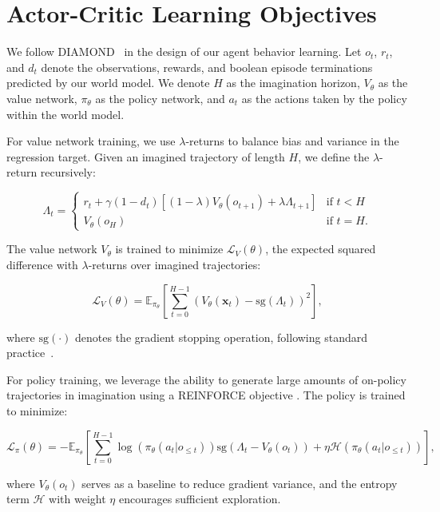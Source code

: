 \section{Actor-Critic Learning Objectives}
\label{appendix:rl_objectives}

We follow DIAMOND~\cite{alonso2024diamond} in the design of our agent behavior learning. Let $o_t$, $r_t$, and $d_t$ denote the observations, rewards, and boolean episode terminations predicted by our world model. We denote $H$ as the imagination horizon, $V_\theta$ as the value network, $\pi_\theta$ as the policy network, and $a_t$ as the actions taken by the policy within the world model.

For value network training, we use $\lambda$-returns to balance bias and variance in the regression target. Given an imagined trajectory of length $H$, we define the $\lambda$-return recursively:

\begin{equation}
   \Lambda_t = \begin{cases}
       r_t + \gamma(1-d_t)[(1-\lambda)V_\theta(o_{t+1}) + \lambda\Lambda_{t+1}] & \text{if } t < H \\
       V_\theta(o_H) & \text{if } t = H.
   \end{cases}
\end{equation}

The value network $V_\theta$ is trained to minimize $\mathcal{L}_V(\theta)$, the expected squared difference with $\lambda$-returns over imagined trajectories:

\begin{equation}
   \mathcal{L}_V(\theta) = \mathbb{E}_{\pi_\theta}\left[\sum_{t=0}^{H-1} (V_\theta(\mathbf{x}_t) - \text{sg}(\Lambda_t))^2\right],
\end{equation}

where $\text{sg}(\cdot)$ denotes the gradient stopping operation, following standard practice~\cite{hafner2024DreamerV3,micheli2023iris}.

For policy training, we leverage the ability to generate large amounts of on-policy trajectories in imagination using a REINFORCE objective \cite{Sutton1998reinforcementlearning}. The policy is trained to minimize:

\begin{equation}
   \mathcal{L}_\pi(\theta) = -\mathbb{E}_{\pi_\theta}\left[\sum_{t=0}^{H-1} \log(\pi_\theta(a_t|o_{\leq t}))\text{sg}(\Lambda_t - V_\theta(o_t)) + \eta\mathcal{H}(\pi_\theta(a_t|o_{\leq t}))\right],
\end{equation}

where $V_\theta(o_t)$ serves as a baseline to reduce gradient variance, and the entropy term $\mathcal{H}$ with weight $\eta$ encourages sufficient exploration.
